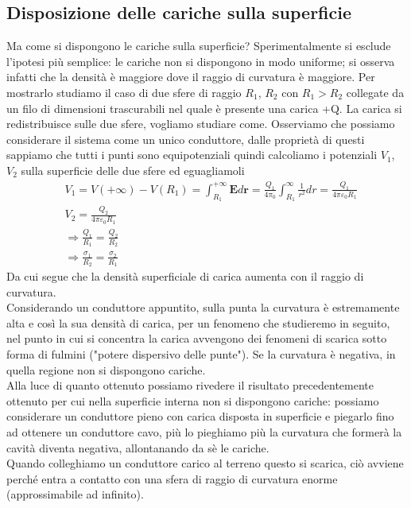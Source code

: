 \documentclass[
10pt, %
a4paper, %
oneside, %
headinclude,footinclude, %
BCOR5mm, %
]{scrartcl}
\begin{document}
\subsection{Disposizione delle cariche sulla superficie}
Ma come si dispongono le cariche sulla superficie? Sperimentalmente si esclude l'ipotesi più semplice: le cariche non si dispongono in modo uniforme; si osserva infatti che la densità è maggiore dove il raggio di curvatura è maggiore. Per mostrarlo studiamo il caso di due sfere di raggio \(R_1\), \(R_2\) con \(R_1>R_2\) collegate da un filo di dimensioni trascurabili nel quale è presente una carica +Q. La carica si redistribuisce sulle due sfere, vogliamo studiare come. Osserviamo che possiamo considerare il sistema come un unico conduttore, dalle proprietà di questi sappiamo che tutti i punti sono equipotenziali quindi calcoliamo i potenziali \(V_1\), \(V_2\) sulla superficie delle due sfere ed eguagliamoli
\begin{align*}
	&V_1 = V(+\infty) - V(R_1) = \int_{R_1}^{+\infty} \mathbf{E}d\mathbf{r} =  \frac{Q_1}{4\pi_0}\int_{R_1}^{\infty}\frac{1}{r^2}dr = \frac{Q_1}{4\pi\varepsilon_0R_1} \\
	&V_2 = \frac{Q_2}{4\pi\varepsilon_0R_1}\\
	&\Rightarrow \frac{Q_1}{R_1}= \frac{Q_2}{R_2}\\
	&\Rightarrow \frac{\sigma_1}{R_2} = \frac{\sigma_2}{R_1}
\end{align*}
Da cui segue che la densità superficiale di carica aumenta con il raggio di curvatura.\\
Considerando un conduttore appuntito, sulla punta la curvatura è estremamente alta e così la sua densità di carica, per un fenomeno che studieremo in seguito, nel punto in cui si concentra la carica avvengono dei fenomeni di scarica sotto forma di fulmini ("potere dispersivo delle punte"). Se la curvatura è negativa, in quella regione non si dispongono cariche.\\
Alla luce di quanto ottenuto possiamo rivedere il risultato precedentemente ottenuto per cui nella superficie interna non si dispongono cariche: possiamo considerare un conduttore pieno con carica disposta in superficie e piegarlo fino ad ottenere un conduttore cavo, più lo pieghiamo più la curvatura che formerà la cavità diventa negativa, allontanando da sè le cariche.\\
Quando colleghiamo un conduttore carico al terreno questo si scarica, ciò avviene perché entra a contatto con una sfera di raggio di curvatura enorme (approssimabile ad infinito). 
\end{document}

